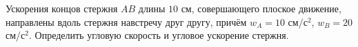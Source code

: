 Ускорения концов стержня $AB$ длины $10$ см, совершающего плоское
движение, направлены вдоль стержня навстречу друг другу, причём $w_A=10$
см/с$^2$, $w_B=20$ см/с$^2$. Определить угловую скорость и угловое
ускорение стержня.
